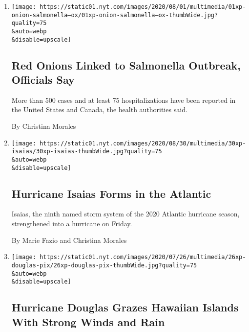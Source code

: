 \begin{enumerate}
\def\labelenumi{\arabic{enumi}.}
\item
  \href{/2020/08/01/us/salmonella-outbreak-onions.html}{}

  \texttt{[image: https://static01.nyt.com/images/2020/08/01/multimedia/01xp-onion-salmonella--ox/01xp-onion-salmonella--ox-thumbWide.jpg?quality=75\\\&auto=webp\\\&disable=upscale]}

  \hypertarget{red-onions-linked-to-salmonella-outbreak-officials-say}{%
  \subsection{Red Onions Linked to Salmonella Outbreak, Officials
  Say}\label{red-onions-linked-to-salmonella-outbreak-officials-say}}

  More than 500 cases and at least 75 hospitalizations have been
  reported in the United States and Canada, the health authorities said.

  By Christina Morales
\item
  \href{/2020/07/30/us/tropical-storm-isaias.html}{}

  \texttt{[image: https://static01.nyt.com/images/2020/08/30/multimedia/30xp-isaias/30xp-isaias-thumbWide.jpg?quality=75\\\&auto=webp\\\&disable=upscale]}

  \hypertarget{hurricane-isaias-forms-in-the-atlantic}{%
  \subsection{Hurricane Isaias Forms in the
  Atlantic}\label{hurricane-isaias-forms-in-the-atlantic}}

  Isaias, the ninth named storm system of the 2020 Atlantic hurricane
  season, strengthened into a hurricane on Friday.

  By Marie Fazio and Christina Morales
\item
  \href{/2020/07/26/us/hurricane-douglas-hawaii.html}{}

  \texttt{[image: https://static01.nyt.com/images/2020/07/26/multimedia/26xp-douglas-pix/26xp-douglas-pix-thumbWide.jpg?quality=75\\\&auto=webp\\\&disable=upscale]}

  \hypertarget{hurricane-douglas-grazes-hawaiian-islands-with-strong-winds-and-rain}{%
  \subsection{Hurricane Douglas Grazes Hawaiian Islands With Strong
  Winds and
  Rain}\label{hurricane-douglas-grazes-hawaiian-islands-with-strong-winds-and-rain}}


\end{enumerate}

